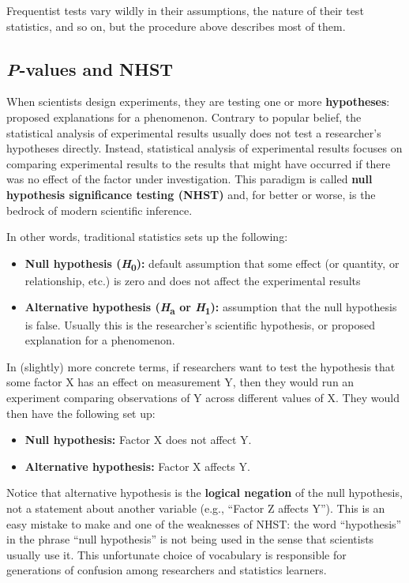 \documentclass[
  13,
  letterpaper,
]{report}
\begin{document}
Frequentist tests vary wildly in their assumptions, the nature of their
test statistics, and so on, but the procedure above describes most of
them.

\subsection{\texorpdfstring{\emph{P}-values and
NHST}{P-values and NHST}}\label{mod-09-pvalues}

When scientists design experiments, they are testing one or more
\textbf{hypotheses}: proposed explanations for a phenomenon. Contrary to
popular belief, the statistical analysis of experimental results usually
does not test a researcher's hypotheses directly. Instead, statistical
analysis of experimental results focuses on comparing experimental
results to the results that might have occurred if there was no effect
of the factor under investigation. This paradigm is called \textbf{null
hypothesis significance testing (NHST)} and, for better or worse, is the
bedrock of modern scientific inference.

In other words, traditional statistics sets up the following:

\begin{itemize}
\item
  \textbf{Null hypothesis (\emph{H}\textsubscript{0}):} default
  assumption that some effect (or quantity, or relationship, etc.) is
  zero and does not affect the experimental results
\item
  \textbf{Alternative hypothesis (\emph{H}\textsubscript{a} or
  \emph{H}\textsubscript{1}):} assumption that the null hypothesis is
  false. Usually this is the researcher's scientific hypothesis, or
  proposed explanation for a phenomenon.
\end{itemize}

In (slightly) more concrete terms, if researchers want to test the
hypothesis that some factor X has an effect on measurement Y, then they
would run an experiment comparing observations of Y across different
values of X. They would then have the following set up:

\begin{itemize}
\item
  \textbf{Null hypothesis:} Factor X does not affect Y.
\item
  \textbf{Alternative hypothesis:} Factor X affects Y.
\end{itemize}

Notice that alternative hypothesis is the \textbf{logical negation} of
the null hypothesis, not a statement about another variable (e.g.,
``Factor Z affects Y''). This is an easy mistake to make and one of the
weaknesses of NHST: the word ``hypothesis'' in the phrase ``null
hypothesis'' is not being used in the sense that scientists usually use
it. This unfortunate choice of vocabulary is responsible for generations
of confusion among researchers and statistics learners.
\end{document}
